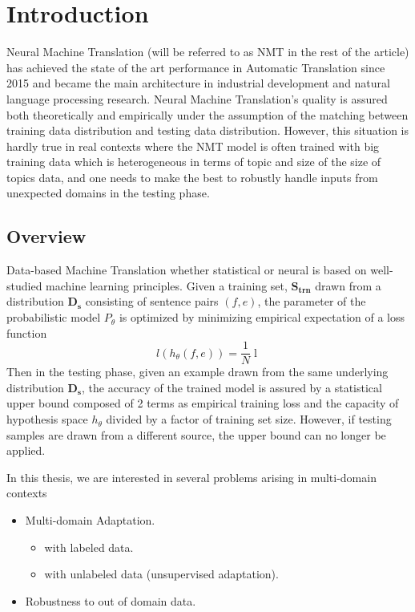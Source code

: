 \documentclass[12pt,a4paper,twoside]{report}
\theoremstyle{definition}
\begin{document}
\setlength{\belowdisplayskip}{8pt} \setlength{\belowdisplayshortskip}{8pt}
\setlength{\abovedisplayskip}{8pt} \setlength{\abovedisplayshortskip}{8pt}
\setlength{\parskip}{0.1cm}
\setlength{\parindent}{1em}
\section*{Introduction}
Neural Machine Translation (will be referred to as NMT in the rest of the article) has achieved the state of the art performance in Automatic Translation since 2015 and became the main architecture in industrial development and natural language processing research. Neural Machine Translation’s quality is assured both theoretically and empirically under the assumption of the matching between training data distribution and testing data distribution. However, this situation is hardly true in real contexts where the NMT model is often trained with big training data which is heterogeneous in terms of topic and size of the size of topics data, and one needs to make the best to robustly handle inputs from unexpected domains in the testing phase.
\subsection*{Overview}
Data-based Machine Translation whether statistical or neural is based on well-studied machine learning principles. Given a training set, $\mathbf{S_{trn}}$ drawn from a distribution $\mathbf{D_s}$ consisting of sentence pairs $(f,e)$, the parameter of the probabilistic model $P_{\theta}$ is optimized by minimizing empirical expectation of a loss function
$$l(h_{\theta}(f,e)) = \frac{1}{N}\displaystyle{\mathop{\sum_{(f,e)\in \mathbf{S_{trn}}}l(h_{\theta}(f,e))}}$$
Then in the testing phase, given an example drawn from the same underlying distribution $\mathbf{D_s}$, the accuracy of the trained model is assured by a statistical upper bound composed of 2 terms as empirical training loss and the capacity of hypothesis space $h_{\theta}$ divided by a factor of training set size. However, if testing samples are drawn from a different source, the upper bound can no longer be applied.

In this thesis, we are interested in several problems arising in multi-domain contexts
\begin{itemize}
	\item Multi-domain Adaptation.
		\begin{itemize}
			\item with labeled data.
			\item with unlabeled data (unsupervised adaptation).
		\end{itemize}
	\item Robustness to out of domain data.
\end{itemize}
\end{document}
